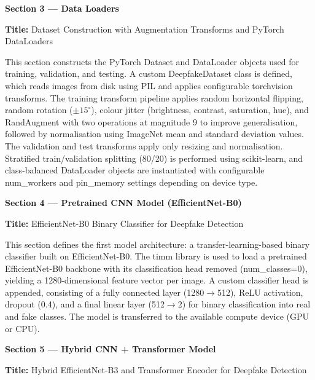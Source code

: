 \documentclass[12pt,a4paper]{report}
\begin{document}
\begin{description}
\vspace{0.5cm}

\textbf{Section 3 --- Data Loaders}

\textbf{Title:} Dataset Construction with Augmentation Transforms and PyTorch DataLoaders

This section constructs the PyTorch Dataset and DataLoader objects used for training, validation, and testing. A custom DeepfakeDataset class is defined, which reads images from disk using PIL and applies configurable torchvision transforms. The training transform pipeline applies random horizontal flipping, random rotation ($\pm15^\circ$), colour jitter (brightness, contrast, saturation, hue), and RandAugment with two operations at magnitude 9 to improve generalisation, followed by normalisation using ImageNet mean and standard deviation values. The validation and test transforms apply only resizing and normalisation. Stratified train/validation splitting (80/20) is performed using scikit-learn, and class-balanced DataLoader objects are instantiated with configurable num\_workers and pin\_memory settings depending on device type.

\vspace{0.5cm}

\textbf{Section 4 --- Pretrained CNN Model (EfficientNet-B0)}

\textbf{Title:} EfficientNet-B0 Binary Classifier for Deepfake Detection

This section defines the first model architecture: a transfer-learning-based binary classifier built on EfficientNet-B0. The timm library is used to load a pretrained EfficientNet-B0 backbone with its classification head removed (num\_classes=0), yielding a 1280-dimensional feature vector per image. A custom classifier head is appended, consisting of a fully connected layer (1280$\rightarrow$512), ReLU activation, dropout (0.4), and a final linear layer (512$\rightarrow$2) for binary classification into real and fake classes. The model is transferred to the available compute device (GPU or CPU).

\vspace{0.5cm}

\textbf{Section 5 --- Hybrid CNN + Transformer Model}

\textbf{Title:} Hybrid EfficientNet-B3 and Transformer Encoder for Deepfake Detection


\end{description}
\end{document}
